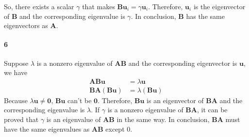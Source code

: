 \documentclass[22pt]{article}
\begin{document}
	 So, there exists a scalar $\gamma$ that makes $\mathbf{Bu}_i = \gamma\mathbf{u}_i$. Therefore, $\mathbf{u}_i$ is the eigenvector of $\mathbf{B}$ and the corresponding eigenvalue is $\gamma$. In conclusion, $\mathbf{B}$ has the same eigenvectors as $\mathbf{A}$.

	\paragraph{6} Suppose $\lambda$ is a nonzero eigenvalue of $\mathbf{AB}$ and the corresponding eigenvector is $\mathbf{u}$, we have 
	\begin{align}
		\mathbf{ABu} & =  \lambda \mathbf{u}\\
		\mathbf{BA(Bu)} & =  \lambda \mathbf{(Bu)}
	\end{align} 
	Because $\lambda\mathbf{u}\not= \mathbf{0}$, $\mathbf{Bu}$ can't be $\mathbf{0}$. Therefore, $\mathbf{Bu}$ is an eigenvector of $\mathbf{BA}$ and the corresponding eigenvalue is $\lambda$. If $\gamma$ is a nonzero eigenvalue of $\mathbf{BA}$, it can be proved that $\gamma$ is an eigenvalue of $\mathbf{AB}$ in the same way. In conclusion, $\mathbf{BA}$ must have the same eigenvalues as $\mathbf{AB}$ except 0.
\end{document}
